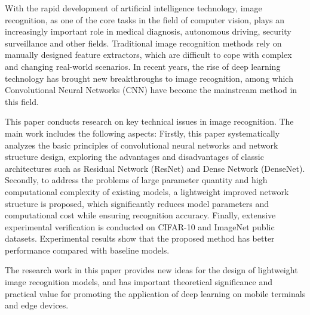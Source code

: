 \begin{enabstract}

With the rapid development of artificial intelligence technology, image recognition, as one of the core tasks in the field of computer vision, plays an increasingly important role in medical diagnosis, autonomous driving, security surveillance and other fields. Traditional image recognition methods rely on manually designed feature extractors, which are difficult to cope with complex and changing real-world scenarios. In recent years, the rise of deep learning technology has brought new breakthroughs to image recognition, among which Convolutional Neural Networks (CNN) have become the mainstream method in this field.

This paper conducts research on key technical issues in image recognition. The main work includes the following aspects: Firstly, this paper systematically analyzes the basic principles of convolutional neural networks and network structure design, exploring the advantages and disadvantages of classic architectures such as Residual Network (ResNet) and Dense Network (DenseNet). Secondly, to address the problems of large parameter quantity and high computational complexity of existing models, a lightweight improved network structure is proposed, which significantly reduces model parameters and computational cost while ensuring recognition accuracy. Finally, extensive experimental verification is conducted on CIFAR-10 and ImageNet public datasets. Experimental results show that the proposed method has better performance compared with baseline models.

The research work in this paper provides new ideas for the design of lightweight image recognition models, and has important theoretical significance and practical value for promoting the application of deep learning on mobile terminals and edge devices.

\end{enabstract}
